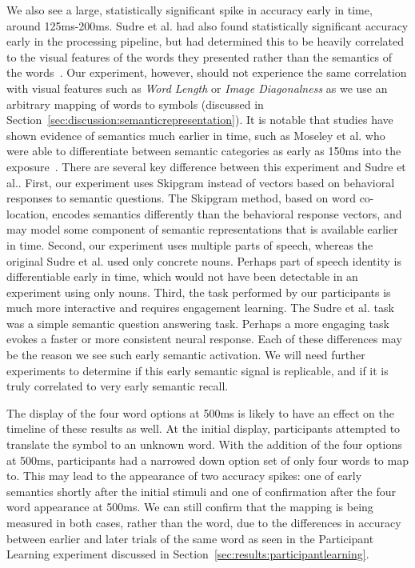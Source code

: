 We also see a large, statistically significant spike in \tvt accuracy early in 
time, around 125ms-200ms. Sudre et al. had also found statistically significant 
accuracy early in the processing pipeline, but had determined this to be 
heavily correlated to the visual features of the words they presented rather 
than the semantics of the words~\cite{Sudre2012}. Our experiment, however, 
should not experience the same correlation with visual features such as 
\emph{Word Length} or \emph{Image Diagonalness} as we use an arbitrary mapping 
of words to symbols (discussed in 
Section~\ref{sec:discussion:semanticrepresentation}). It is notable that 
studies have shown evidence of semantics much earlier in time, such as Moseley 
et al. who were able to differentiate between semantic categories as early as 
150ms into the exposure~\cite{moseley2013sensorimotor}. There are several key 
difference between this experiment and Sudre et al..  First, our experiment 
uses Skipgram instead of vectors based on behavioral responses to semantic 
questions. The Skipgram method, based on word co-location, encodes semantics 
differently than the behavioral response vectors, and may model some component 
of semantic representations that is available earlier in time.  Second, our 
experiment uses multiple parts of speech, whereas the original Sudre et al. 
used only concrete nouns.  Perhaps part of speech identity is differentiable 
early in time, which would not have been detectable in an experiment using only 
nouns.  Third, the task performed by our participants is much more interactive 
and requires engagement learning.  The Sudre et al. task was a simple semantic 
question answering task. Perhaps a more engaging task evokes a faster or more 
consistent neural response.  Each of these differences may be the reason we see 
such early semantic activation.  We will need further experiments to determine 
if this early semantic signal is replicable, and if it is truly correlated to 
very early semantic recall.

The display of the four word options at 500ms is likely to have an effect on 
the timeline of these results as well. At the initial display, participants 
attempted to translate the symbol to an unknown word. With the addition of the 
four options at 500ms, participants had a narrowed down option set of only four 
words to map to. This may lead to the appearance of two accuracy spikes: one of 
early semantics shortly after the initial stimuli and one of confirmation after 
the four word appearance at 500ms. We can still confirm that the mapping is 
being measured in both cases, rather than the word, due to the differences in 
\tvt accuracy between earlier and later trials of the same word as seen in the 
Participant Learning experiment discussed in 
Section~\ref{sec:results:participantlearning}.
